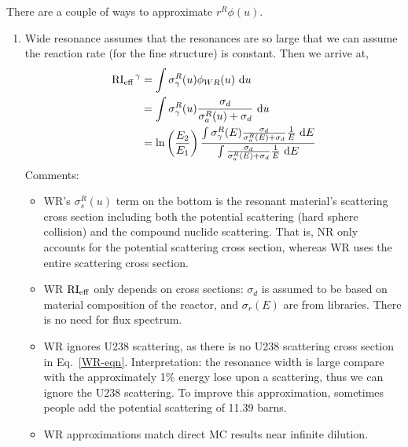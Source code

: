 \documentclass{school-22.211-notes}
\begin{document}
There are a couple of ways to approximate $r^R \phi(u)$. 
\begin{enumerate}
\item Wide resonance assumes that the resonances are so large that we can assume the reaction rate (for the fine structure) is constant. 
Then we arrive at, 
\begin{align}
\left. \mathrm{RI}_{\mathrm{eff}} \right.^{\gamma} &= \int \sigma_{\gamma}^R (u) \phi_{WR} (u) \mbox{ }\mathrm{d} u \\
&= \int \sigma_{\gamma}^R (u) \frac{\sigma_d}{\sigma_a^R(u) + \sigma_d} \mbox{ }\mathrm{d} u \\
&= \ln\left( \frac{E_2}{E_1} \right) \frac{ \int \sigma_{\gamma}^R (E) \frac{\sigma_d}{\sigma_{a}^R(E) + \sigma_d} \frac{1}{E} \mbox{ }\mathrm{d} E}{ \int \frac{\sigma_d}{\sigma_{a}^R(E) + \sigma_d} \frac{1}{E} \mbox{ }\mathrm{d} E}
\end{align}
Comments:
\begin{itemize}
\item WR's $\sigma_s^R (u)$ term on the bottom is the resonant material's scattering cross section including both the potential scattering (hard sphere collision) and the compound nuclide scattering. That is, NR only accounts for the potential scattering cross section, whereas WR uses the entire scattering cross section. 

\item WR $\mathrm{RI}_{\mathrm{eff}}$ only depends on cross sections: $\sigma_d$ is assumed to be based on material composition of the reactor, and $\sigma_r(E)$ are from libraries. There is no need for flux spectrum. 

\item WR ignores U238 scattering, as there is no U238 scattering cross section in Eq.~\ref{WR-eqn}. Interpretation: the resonance width is large compare with the approximately 1\% energy lose upon a scattering, thus we can ignore the U238 scattering. To improve this approximation, sometimes people add the potential scattering of 11.39 barns. 

\item WR approximations match direct MC results near infinite dilution. 
\end{itemize}




\end{enumerate}
\end{document}
